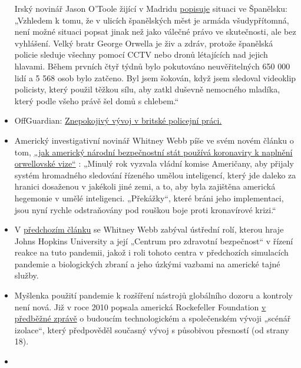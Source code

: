 \begin{itemize}
  Irský novinář Jason O'Toole žijící v Madridu
  \href{https://www.rt.com/op-ed/486350-spain-tough-rules-covid-19-lockdown/}{popisuje}
  situaci ve Španělsku: „Vzhledem k tomu, že v ulicích španělských měst
  je armáda všudypřítomná, není možné situaci popsat jinak než jako
  válečné právo ve skutečnosti, ale bez vyhlášení. Velký bratr George
  Orwella je živ a zdráv, protože španělská policie sleduje všechny
  pomocí CCTV nebo dronů létajících nad jejich hlavami. Během prvních
  čtyř týdnů bylo pokutováno neuvěřitelných 650 000 lidí a 5 568 osob
  bylo zatčeno. Byl jsem šokován, když jsem sledoval videoklip
  policisty, který použil těžkou sílu, aby zatkl duševně nemocného
  mladíka, který podle všeho právě šel domů s chlebem.``
\item
  OffGuardian:
  \href{https://off-guardian.org/2020/04/18/the-disturbing-developments-in-uk-policing/}{Znepokojivý
  vývoj v britské policejní práci.}
\item
  Americký investigativní novinář Whitney Webb píše ve svém novém článku
  o tom,
  \href{https://www.thelastamericanvagabond.com/top-news/techno-tyranny-how-us-national-security-state-using-coronavirus-fulfill-orwellian-vision/}{„jak
  americký národní bezpečnostní stát používá koronaviry k naplnění
  orwellovské vize``} : „Minulý rok vyzvala vládní komise Američany, aby
  přijaly systém hromadného sledování řízeného umělou inteligencí, který
  jde daleko za hranici dosaženou v jakékoli jiné zemi, a to, aby byla
  zajištěna americká hegemonie v umělé inteligenci. „Překážky``, které
  bráni jeho implementaci, jsou nyní rychle odstraňovány pod rouškou
  boje proti kronavírové krizi.``
\item
  V
  \href{https://www.thelastamericanvagabond.com/top-news/all-roads-lead-dark-winter/}{předchozím
  článku} se Whitney Webb zabýval ústřední rolí, kterou hraje Johns
  Hopkins University a její „Centrum pro zdravotní bezpečnost`` v řízení
  reakce na tuto pandemii, jakož i roli tohoto centra v předchozích
  simulacích pandemie a biologických zbraní a jeho úzkými vazbami na
  americké tajné služby.
\item
  Myšlenka použití pandemie k rozšíření nástrojů globálního dozoru a
  kontroly není nová. Již v roce 2010 popsala americká Rockefeller
  Foundation
  \href{https://swprs.files.wordpress.com/2020/04/rockefeller-foundation-scenarios-2010.pdf}{v
  předběžné zprávě} o budoucím technologickém a společenském vývoji
  „scénář izolace``, který předpověděl současný vývoj s působivou
  přesností (od strany 18).
\item

\end{itemize}
